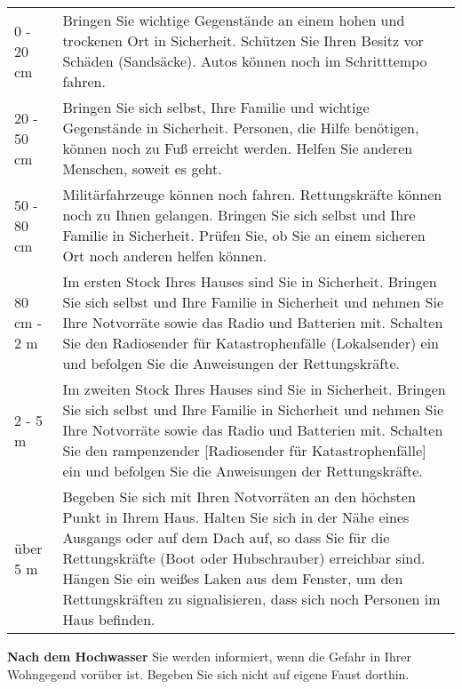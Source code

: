 \begin{tabular}[]{l p{10cm}}
0 - 20 cm &
Bringen Sie wichtige Gegenstände an einem hohen und trockenen Ort in Sicherheit. 
\newline Schützen Sie Ihren Besitz vor Schäden (Sandsäcke).
\newline Autos können noch im Schritttempo fahren. 
\newline\\ 
20 - 50 cm &
Bringen Sie sich selbst, Ihre Familie und wichtige Gegenstände in Sicherheit.
\newline Personen, die Hilfe benötigen, können noch zu Fuß erreicht werden. Helfen Sie anderen Menschen, soweit es geht.
\newline\\
50 - 80 cm &
Militärfahrzeuge können noch fahren. Rettungskräfte können noch zu Ihnen gelangen.
\newline Bringen Sie sich selbst und Ihre Familie in Sicherheit.
\newline Prüfen Sie, ob Sie an einem sicheren Ort noch anderen helfen können.
\newline\\
80 cm - 2 m &
Im ersten Stock Ihres Hauses sind Sie in Sicherheit.
\newline Bringen Sie sich selbst und Ihre Familie in Sicherheit und nehmen Sie Ihre Notvorräte sowie das Radio und Batterien mit.
\newline Schalten Sie den Radiosender für Katastrophenfälle (Lokalsender) ein und befolgen Sie die Anweisungen der Rettungskräfte.
\newline\\
2 - 5 m &
Im zweiten Stock Ihres Hauses sind Sie in Sicherheit.
\newline Bringen Sie sich selbst und Ihre Familie in Sicherheit und nehmen Sie Ihre Notvorräte sowie das Radio und Batterien mit.
\newline Schalten Sie den rampenzender [Radiosender für Katastrophenfälle] ein und befolgen Sie die Anweisungen der Rettungskräfte.
\newline\\
über 5 m &
Begeben Sie sich mit Ihren Notvorräten an den höchsten Punkt in Ihrem Haus.
\newline Halten Sie sich in der Nähe eines Ausgangs oder auf dem Dach auf, so dass Sie für die Rettungskräfte (Boot oder Hubschrauber) erreichbar sind. 
\newline Hängen Sie ein weißes Laken aus dem Fenster, um den Rettungskräften zu signalisieren, dass sich noch Personen im Haus befinden.
\\
\end{tabular}
\newline\newline 
\textnormal{\newline\bfseries Nach dem Hochwasser}
\newline 
Sie werden informiert, wenn die Gefahr in Ihrer Wohngegend vorüber ist. Begeben Sie sich nicht auf eigene Faust dorthin.